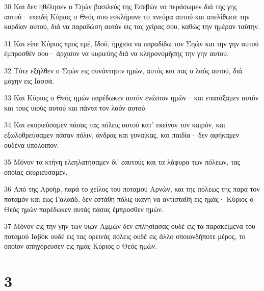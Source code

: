 \par 30 Και δεν ηθέλησεν ο Σηών βασιλεύς της Εσεβών να περάσωμεν διά της γης αυτού· επειδή Κύριος ο Θεός σου εσκλήρυνε το πνεύμα αυτού και απελίθωσε την καρδίαν αυτού, διά να παραδώση αυτόν εις τας χείρας σου, καθώς την ημέραν ταύτην.
\par 31 Και είπε Κύριος προς εμέ, Ιδού, ήρχισα να παραδίδω τον Σηών και την γην αυτού έμπροσθέν σου· άρχισον να κυριεύης διά να κληρονομήσης την γην αυτού.
\par 32 Τότε εξήλθεν ο Σηών εις συνάντησιν ημών, αυτός και πας ο λαός αυτού, διά μάχην εις Ιασσά.
\par 33 Και Κύριος ο Θεός ημών παρέδωκεν αυτόν ενώπιον ημών· και επατάξαμεν αυτόν και τους υιούς αυτού και πάντα τον λαόν αυτού.
\par 34 Και εκυριεύσαμεν πάσας τας πόλεις αυτού κατ' εκείνον τον καιρόν, και εξωλοθρεύσαμεν πάσαν πόλιν, άνδρας και γυναίκας, και παιδία· δεν αφήκαμεν ουδένα υπόλοιπον.
\par 35 Μόνον τα κτήνη ελεηλατήσαμεν δι' εαυτούς και τα λάφυρα των πόλεων, τας οποίας εκυριεύσαμεν.
\par 36 Από της Αροήρ, παρά το χείλος του ποταμού Αρνών, και της πόλεως της παρά τον ποταμόν και έως Γαλαάδ, δεν εστάθη πόλις ικανή να αντισταθή εις ημάς· Κύριος ο Θεός ημών παρέδωκεν αυτάς πάσας έμπροσθεν ημών.
\par 37 Μόνον εις την γην των υιών Αμμών δεν επλησίασας ουδέ εις τα παρακείμενα του ποταμού Ιαβόκ ουδέ εις τας ορεινάς πόλεις ουδέ εις άλλο οποιονδήποτε μέρος, το οποίον απηγόρευσεν εις ημάς Κύριος ο Θεός ημών.

\chapter{3}

